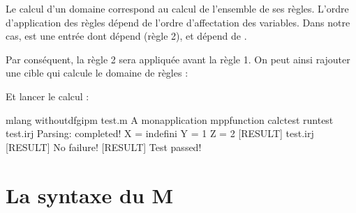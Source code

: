 \documentclass[letterpaper,10pt,french]{sphinxmanual}
\begin{document}
\sphinxAtStartPar
Le calcul d’un domaine correspond au calcul de l’ensemble de ses règles.
L’ordre d’application des règles dépend de l’ordre d’affectation des variables.
Dans notre cas,  est une entrée dont  dépend (règle 2), et  dépend de
.

\sphinxAtStartPar
Par conséquent, la règle 2 sera appliquée avant la règle 1.
On peut ainsi rajouter une cible qui calcule le domaine de règles :

\begin{sphinxVerbatim}[commandchars=\\\{\}]
 
  
  
 
 
 
 
 
 
 
\end{sphinxVerbatim}

\sphinxAtStartPar
Et lancer le calcul :

\begin{sphinxVerbatim}[commandchars=\\\{\}]
 \PYGZdl{} mlang \PYGZhy{}\PYGZhy{}without\PYGZus{}dfgip\PYGZus{}m test.m \PYGZhy{}A mon\PYGZus{}application \PYGZhy{}\PYGZhy{}mpp\PYGZus{}function calc\PYGZus{}test \PYGZhy{}\PYGZhy{}run\PYGZus{}test test.irj
 Parsing: completed!
 X = indefini
 Y = 1
 Z = 2
 [RESULT] test.irj
 [RESULT] No failure!
 [RESULT] Test passed!
\end{sphinxVerbatim}

\sphinxstepscope


\section{La syntaxe du M}
\label{\detokenize{syntax:la-syntaxe-du-m}}\label{\detokenize{syntax:syntax}}\label{\detokenize{syntax::doc}}
\end{document}
